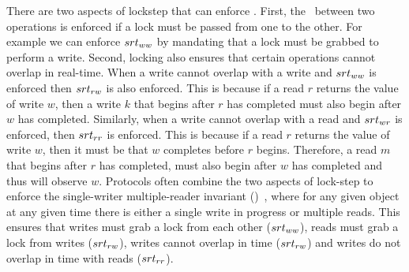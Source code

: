 There are two aspects of lockstep that can enforce \srts.
First, the \srt\ between two operations is enforced if a lock must be passed from one to the other. 
For example we can enforce $srt_{ww}$ by mandating that a lock must be grabbed to perform a write.
Second, locking also ensures that certain operations cannot overlap in real-time.
When a write cannot overlap with a write and $srt_{ww}$ is enforced then $srt_{rw}$ is also enforced. This is because if a read $r$ returns the value of write $w$, then a write $k$ that begins after $r$ has completed must also begin after $w$ has completed.
Similarly, when a write cannot overlap with a read and $srt_{wr}$ is enforced, then $srt_{rr}$ is enforced. This is because if a read $r$ returns the value of write $w$, then it must be that $w$ completes before $r$ begins. Therefore, a read $m$ that begins after $r$ has completed, must also begin after $w$ has completed and thus will observe $w$.
Protocols often combine the two aspects of lock-step to enforce the single-writer multiple-reader invariant (\SWMR)~\cite{Vijay:2020}, where for any given object at any given time there is either a single write in progress or multiple reads.
This ensures that writes must grab a lock from each other ($srt_{ww}$), reads must grab a lock from writes ($srt_{rw}$), writes cannot overlap in time ($srt_{rw}$) and writes do not overlap in time with reads ($srt_{rr}$).





